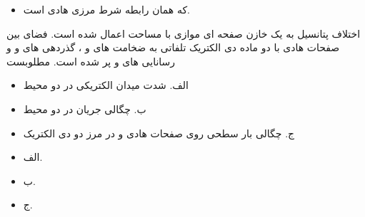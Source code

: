 \begin{ELjoin}

\begin{itemize}
\tightlist
\item
  که همان رابطه شرط مرزی هادی است.
\end{itemize}


\begin{ELexample}{}

اختلاف پتانسیل  به یک خازن صفحه ای موازی با مساحت  اعمال شده است. فضای بین صفحات هادی با دو ماده دی الکتریک تلفاتی به ضخامت های  و ، گذردهی های  و  و رسانایی های  و  پر شده است. مطلوبست

\begin{itemize}
\tightlist
\item
  الف. شدت میدان الکتریکی در دو محیط
\item
  ب. چگالی جریان در دو محیط
\item
  ج. چگالی بار سطحی روی صفحات هادی و در مرز دو دی الکتریک
\end{itemize}


\begin{ELsolution}

\begin{itemize}
\tightlist
\item
  الف.
\end{itemize}


\begin{itemize}
\tightlist
\item
  ب.
\end{itemize}


\begin{itemize}
\tightlist
\item
  ج.
\end{itemize}


\end{ELsolution}
\end{ELexample}
\end{ELjoin}
